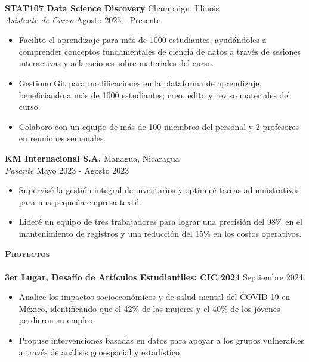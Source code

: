 \documentclass[a4paper]{article}
\newcommand{\lineunder} {
    \vspace*{-8pt} \\
    \hspace*{-18pt} \hrulefill \\
}
\newcommand{\header} [1] {
    {\hspace*{-18pt}\vspace*{6pt} \textsc{#1}}
    \vspace*{-6pt} \lineunder
}
\begin{document}
\vspace{1mm}

\textbf{STAT107 Data Science Discovery} 
\hfill Champaign, Illinois\\
\textit{Asistente de Curso} \hfill Agosto 2023 - Presente\\
    \begin{itemize}[noitemsep]
    \item Facilito el aprendizaje para más de 1000 estudiantes, ayudándoles a comprender conceptos fundamentales de ciencia de datos a través de sesiones interactivas y aclaraciones sobre materiales del curso.
    \item Gestiono Git para modificaciones en la plataforma de aprendizaje, beneficiando a más de 1000 estudiantes; creo, edito y reviso materiales del curso.
    \item Colaboro con un equipo de más de 100 miembros del personal y 2 profesores en reuniones semanales.
    \end{itemize}

\vspace{1mm}

\textbf{KM Internacional S.A.} \hfill Managua, Nicaragua\\
\textit{Pasante} \hfill Mayo 2023 - Agosto 2023\\
    \begin{itemize}[noitemsep]
	\item Supervisé la gestión integral de inventarios y optimicé tareas administrativas para una pequeña empresa textil.
    \item Lideré un equipo de tres trabajadores para lograr una precisión del 98\% en el mantenimiento de registros y una reducción del 15\% en los costos operativos.
    \end{itemize}

\vspace*{1mm}

\header{\textbf{Proyectos}}

\textbf{3er Lugar, Desafío de Artículos Estudiantiles: CIC 2024} \hfill Septiembre 2024 \\
    \begin{itemize}[noitemsep]
        \item Analicé los impactos socioeconómicos y de salud mental del COVID-19 en México, identificando que el 42\% de las mujeres y el 40\% de los jóvenes perdieron su empleo.
        \item Propuse intervenciones basadas en datos para apoyar a los grupos vulnerables a través de análisis geoespacial y estadístico.
    \end{itemize}
\end{document}

